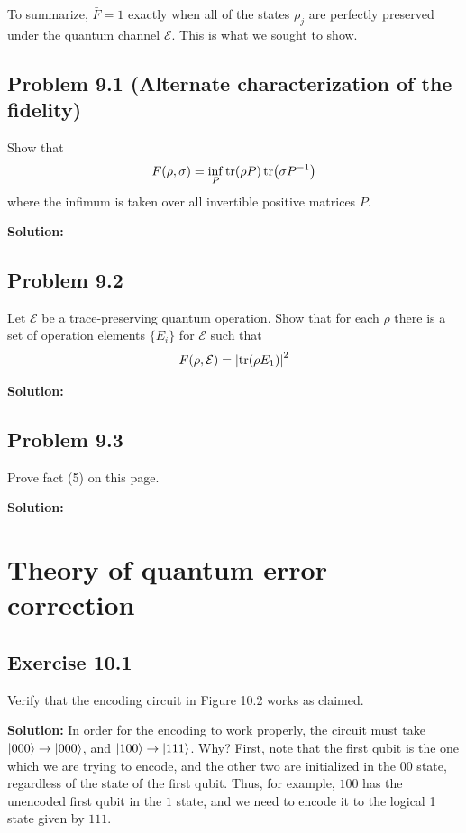 \documentclass{book}
\newcommand{\mc}[1]{\mathcal{#1}}
\begin{document}
    To summarize, $\bar{F} = 1$ exactly when all of the states $\rho_j$ are perfectly preserved under the quantum channel $\mc{E}$. This is what we sought to show.

\section*{Problem 9.1 (Alternate characterization of the fidelity)}
    Show that 
    \begin{align}
        F(\rho, \sigma) = \inf_P \tr(\rho P) \tr(\sigma P^{-1})
    \end{align}
    where the infimum is taken over all invertible positive matrices $P$.

    \textbf{Solution:}

\section*{Problem 9.2}
    Let $\mc{E}$ be a trace-preserving quantum operation. Show that for each $\rho$ there is a set of operation elements $\{E_i\}$ for $\mc{E}$ such that
    \begin{align}
        F(\rho, \mc{E}) = \abs{\tr(\rho E_1)}^2
    \end{align}

    \textbf{Solution:} 

\section*{Problem 9.3}
    Prove fact (5) on this page.

    \textbf{Solution:}

\chapter{Theory of quantum error correction}

\section*{Exercise 10.1}
    Verify that the encoding circuit in Figure 10.2 works as claimed.
    
    \textbf{Solution:} In order for the encoding to work properly, the circuit must take $\ket{000} \rightarrow \ket{000}$, and $\ket{100} \rightarrow \ket{111}$. Why? First, note that the first qubit is the one which we are trying to encode, and the other two are initialized in the $00$ state, regardless of the state of the first qubit. Thus, for example, $100$ has the unencoded first qubit in the $1$ state, and we need to encode it to the logical 1 state given by $111$. 
    
\end{document}
